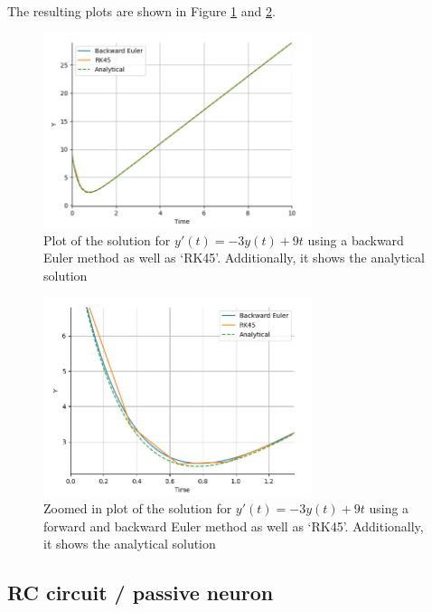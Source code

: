 \documentclass{article}
\begin{document}
    The resulting plots are shown in Figure \ref{fig:other_function} and \ref{fig:other_function_zoom}.

    \begin{figure}[h!]
        \centering
        \includegraphics[width=0.7\textwidth]{other_function.png}
        \caption{Plot of the solution for $y'(t) = -3y(t) + 9t$ using a backward Euler method as well as ‘RK45’. Additionally, it shows the analytical solution}
        \label{fig:other_function}
    \end{figure}

    \begin{figure}[h!]
        \centering
        \includegraphics[width=0.7\textwidth]{other_function_zoom.png}
        \caption{Zoomed in plot of the solution for $y'(t) = -3y(t) + 9t$ using a forward and backward Euler method as well as ‘RK45’. Additionally, it shows the analytical solution}
        \label{fig:other_function_zoom}
    \end{figure}
    \clearpage

    \subsection{RC circuit / passive neuron}
\end{document}
